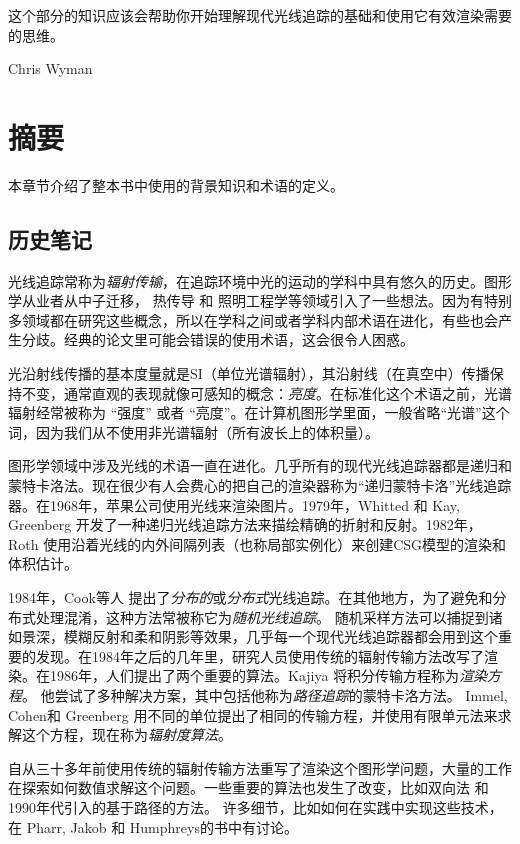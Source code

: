 \documentclass[12pt]{article}
\begin{document}
这个部分的知识应该会帮助你开始理解现代光线追踪的基础和使用它有效渲染需要的思维。

Chris Wyman
 \section{摘要}
 本章节介绍了整本书中使用的背景知识和术语的定义。
 \subsection{历史笔记}
 光线追踪常称为\textit{辐射传输}，在追踪环境中光的运动的学科中具有悠久的历史。图形学从业者从中子迁移\cite{Arvo:1990:PTI:97880.97886}， 热传导\cite{siegel1981thermal} 和 照明工程学\cite{Larson:1998:RRA:286090}等领域引入了一些想法。因为有特别多领域都在研究这些概念，所以在学科之间或者学科内部术语在进化，有些也会产生分歧。经典的论文里可能会错误的使用术语，这会很令人困惑。
 
 光沿射线传播的基本度量就是SI（单位光谱辐射），其沿射线（在真空中）传播保持不变，通常直观的表现就像可感知的概念：\textit{亮度}。在标准化这个术语之前，光谱辐射经常被称为 “强度” 或者 “亮度”。在计算机图形学里面，一般省略“光谱”这个词，因为我们从不使用非光谱辐射（所有波长上的体积量）。
 
 图形学领域中涉及光线的术语一直在进化。几乎所有的现代光线追踪器都是递归和蒙特卡洛法。现在很少有人会费心的把自己的渲染器称为“递归蒙特卡洛”光线追踪器。在1968年，苹果公司\cite{Appel:1968:TSM:1468075.1468082}使用光线来渲染图片。1979年，Whitted \cite{Whitted:1980:IIM:358876.358882} 和 Kay, Greenberg \cite{Kay:1979:TCS:800249.807438}开发了一种递归光线追踪方法来描绘精确的折射和反射。1982年，Roth \cite{ROTH1982109} 使用沿着光线的内外间隔列表（也称局部实例化）来创建CSG模型的渲染和体积估计。
 
 1984年，Cook等人\cite{Cook:1984:DRT:964965.808590} 提出了\textit{分布的}或\textit{分布式}光线追踪。在其他地方，为了避免和分布式处理混淆，这种方法常被称它为\textit{随机光线追踪}。
 随机采样方法可以捕捉到诸如景深，模糊反射和柔和阴影等效果，几乎每一个现代光线追踪器都会用到这个重要的发现。在1984年之后的几年里，研究人员使用传统的辐射传输方法改写了渲染。在1986年，人们提出了两个重要的算法。Kajiya \cite{Kajiya:1986:RE:15922.15902} 将积分传输方程称为\textit{渲染方程}。 他尝试了多种解决方案，其中包括他称为\textit{路径追踪}的蒙特卡洛方法。 Immel, Cohen和 Greenberg\cite{Immel:1986:RMN:15922.15901} 用不同的单位提出了相同的传输方程，并使用有限单元法来求解这个方程，现在称为\textit{辐射度算法}。
 
 自从三十多年前使用传统的辐射传输方法重写了渲染这个图形学问题，大量的工作在探索如何数值求解这个问题。一些重要的算法也发生了改变，比如双向法\cite{LW1993BPT,10.1007/978-3-642-87825-1_11} 和 1990年代引入的基于路径的方法\cite{Veach:1997:MLT:258734.258775}。
许多细节，比如如何在实践中实现这些技术，在 Pharr, Jakob 和 Humphreys的书\cite{pharr2016physically}中有讨论。
\end{document}

